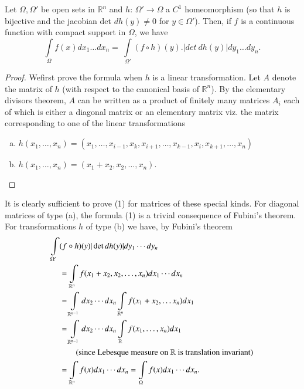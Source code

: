 \setcounter{theorem}{0}
\begin{theorem}\label{chap2:sec5:thm1}%
  Let $\Omega, \Omega'$ be  open
  sets in $\mathbb{R}^n$ and $h$: $\Omega' \to \Omega$ a $ C^1$
  homeomorphism (so that $h$ is bijective and the jacobian det $d h
  (y) \neq 0$ for  $y \in \Omega'$). Then, if $f$ is a continuous
  function with compact support in $\Omega$, we have 
  \begin{equation}
    \int\limits_{\Omega} f (x) dx_1 \ldots dx_n = ~
    \int\limits_{\Omega'} (f \circ h) (y). | det  ~ dh (y) | dy_1
    \ldots dy_n. \tag{5.1}\label{chap2:sec5:eq5.1} 
  \end{equation}
\end{theorem}

\begin{proof}
  We\pageoriginale first prove the formula when $h$ is a linear transformation. Let
  $A$ denote the matrix of $h$ (with respect to the canonical basis of
  $\mathbb{R}^n$). By the elementary divisors theorem, $A$ can be
  written as a product of finitely many matrices $A_i$ each of which
  is either a diagonal matrix or an elementary matrix viz. the matrix
  corresponding to one of the linear transformations 
  \begin{enumerate}[(a)]
  \item $h (x_1, \ldots , x_n) = (x_1, \ldots , x_{i-1}, x_k, x_{i+1},
    \ldots , x_{k-1}, x_i, x_{k+1}, \ldots , x_n)$ 
  \item $h(x_1, \ldots , x_n) = (x_1 + x_2, x_2, \ldots , x_n)$.
  \end{enumerate}
\end{proof}

It is clearly sufficient to prove (1) for matrices of these special
kinds. For diagonal matrices of type (a), the formula (1) is a
trivial consequence of Fubini's theorem. For transformations $h$ of
type (b) we have, by Fubini's theorem 
\begin{align*}
  \int\limits_{\Omega'}&  (f \circ h) (y) | \det dh (y) | dy_1 \cdots dy_n \\
  & = \int \limits_{\mathbb{R}^n} f(x_1 + x_2, x_2 , \ldots , x_n)
  dx_1 \cdots dx_n\\ 
  & = \int \limits_{\mathbb{R}^{n-1}} dx_2 \cdots dx_n
  \int \limits_{\mathbb{R}^n} f(x_1 + x_2, \ldots x_n) dx_1 \\ 
  & =  \int \limits_{\mathbb{R}^{n - 1}} dx_2 \cdots dx_n \int
  \limits_{\mathbb{R}} f(x_1, \ldots , x_n) dx_1\\ 
  & \tag{\text{since
    Lebesque measure on $\mathbb{R}$ is translation invariant}}\\ 
  & = \int \limits_{\mathbb{R}^n} f(x) dx_1 \cdots dx_n = \int
  \limits_{\Omega} f(x) dx_1 \cdots dx_n. 
\end{align*}


